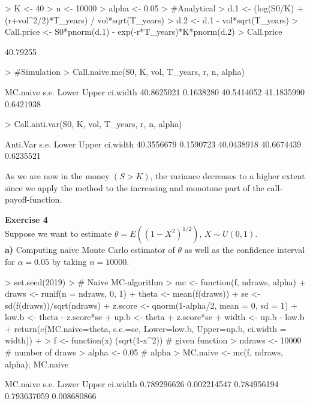 \documentclass{article}
\begin{document}
\begin{Schunk}
\begin{Sinput}
> K <- 40
> n <- 10000
> alpha <- 0.05
> #Analytical
> d.1 <- (log(S0/K) + (r+vol^2/2)*T_years) / vol*sqrt(T_years)
> d.2 <- d.1 - vol*sqrt(T_years)
> Call.price <- S0*pnorm(d.1) - exp(-r*T_years)*K*pnorm(d.2)
> Call.price
\end{Sinput}
\begin{Soutput}
[1] 40.79255
\end{Soutput}
\begin{Sinput}
> #Simulation
> Call.naive.mc(S0, K, vol, T_years, r, n, alpha)
\end{Sinput}
\begin{Soutput}
  MC.naive       s.e.      Lower      Upper   ci.width 
40.8625021  0.1638280 40.5414052 41.1835990  0.6421938 
\end{Soutput}
\begin{Sinput}
> Call.anti.var(S0, K, vol, T_years, r, n, alpha)
\end{Sinput}
\begin{Soutput}
  Anti.Var       s.e.      Lower      Upper   ci.width 
40.3556679  0.1590723 40.0438918 40.6674439  0.6235521 
\end{Soutput}
\end{Schunk}

As we are now in the money $(S>K)$, the variance decreases to a higher extent since we apply the method to the increasing and monotone part of the call-payoff-function.

\newpage
\textbf{Exercise 4} \\
Suppose we want to estimate $\theta = E((1-X^2)^{1/2})$, $X \sim U(0,1)$. \\

\textbf{a)} Computing naive Monte Carlo estimator of $\theta$ as well as the confidence interval for $\alpha = 0.05$ by taking $n = 10000$. 
\begin{Schunk}
\begin{Sinput}
> set.seed(2019)
> # Naive MC-algorithm
> mc <- function(f, ndraws, alpha) {
+   draws <- runif(n = ndraws, 0, 1)
+   theta <- mean(f(draws))
+   se <- sd(f(draws))/sqrt(ndraws)
+   z.score <- qnorm(1-alpha/2, mean = 0, sd = 1)
+   low.b <- theta - z.score*se
+   up.b <- theta + z.score*se
+   width <- up.b - low.b
+   return(c(MC.naive=theta, s.e.=se, Lower=low.b, Upper=up.b, ci.width = width))
+ }
> f <- function(x) (sqrt(1-x^2)) # given function
> ndraws <- 10000 # number of draws
> alpha <- 0.05 # alpha 
> MC.naive <- mc(f, ndraws, alpha); MC.naive
\end{Sinput}
\begin{Soutput}
   MC.naive        s.e.       Lower       Upper    ci.width 
0.789296626 0.002214547 0.784956194 0.793637059 0.008680866 
\end{Soutput}
\end{Schunk}
\end{document}
